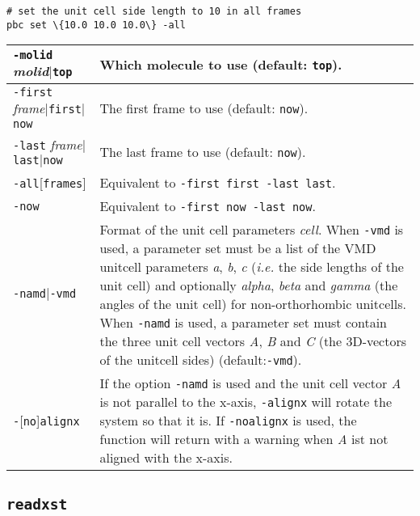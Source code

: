 \documentclass[a4paper, DIV12]{scrartcl}
\newcommand{\ie}{\emph{i.e.}\xspace}
\begin{document}

\begin{Verbatim} 
# set the unit cell side length to 10 in all frames
pbc set \{10.0 10.0 10.0\} -all
\end{Verbatim}


\begin{tabular}{|p{}|p{}|}
\hline

\texttt{-molid} \textit{molid}$|$\texttt{top}
& Which molecule to use (default: \texttt{top}).
\\ \hline

\texttt{-first} \textit{frame}$|$\texttt{first}$|$\texttt{now}
& The first frame to use (default: \texttt{now}).
\\ \hline

\texttt{-last} \textit{frame}$|$\texttt{last}$|$\texttt{now}
& The last frame to use (default: \texttt{now}).
\\ \hline

\texttt{-all}[\texttt{frames}]
& Equivalent to \texttt{-first first -last last}.
\\ \hline

\texttt{-now}
& Equivalent to \texttt{-first now -last now}.
\\ \hline

\texttt{-namd}$|$\texttt{-vmd}
& Format of the unit cell parameters \textit{cell}. When \texttt{-vmd}
is used, a parameter set must be a list of the VMD unitcell parameters
\textit{a}, \textit{b}, \textit{c} (\ie the side lengths of the unit
cell) and optionally \textit{alpha}, \textit{beta} and \textit{gamma}
(the angles of the unit cell) for non-orthorhombic unitcells. When
\texttt{-namd} is used, a parameter set must contain the three unit
cell vectors \textit{A}, \textit{B} and \textit{C} (the 3D-vectors of
the unitcell sides) (default:\texttt{-vmd}).
\\ \hline

\texttt{-}[\texttt{no}]\texttt{alignx} 
& If the option \texttt{-namd} is used and the unit cell vector
\textit{A} is not parallel to the x-axis, \texttt{-alignx} will rotate
the system so that it is. If \texttt{-noalignx} is used, the function
will return with a warning when \textit{A} ist not aligned with the
x-axis.
\\ \hline
\end{tabular}
 
\newpage
\subsection{\texttt{readxst}}
\label{sec:readxst}
\end{document}
